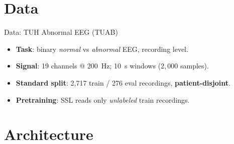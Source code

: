 \documentclass[aspectratio=169]{beamer}
\newcommand{\nchan}{19}                %
\newcommand{\sfreq}{200}               %
\newcommand{\winsec}{10}               %
\newcommand{\winsamp}{2{,}000}         %
\newcommand{\nrectr}{2{,}717}          %
\newcommand{\nrecev}{276}              %
\begin{document}
\section{Data}

\begin{frame}{Data: TUH Abnormal EEG (TUAB)}
  \vspace{0.3em}
  \begin{itemize}
    \item \textbf{Task}: binary \emph{normal} vs \emph{abnormal} EEG, recording level.
    \item \textbf{Signal}: \nchan{} channels @ \sfreq~Hz; \winsec~s windows ($\winsamp$ samples).
    \item \textbf{Standard split}: \nrectr{} train / \nrecev{} eval recordings, \textbf{patient-disjoint}.
    \item \textbf{Pretraining}: SSL reads only \emph{unlabeled} train recordings.
  \end{itemize}
\end{frame}


\section{Architecture}
\end{document}
